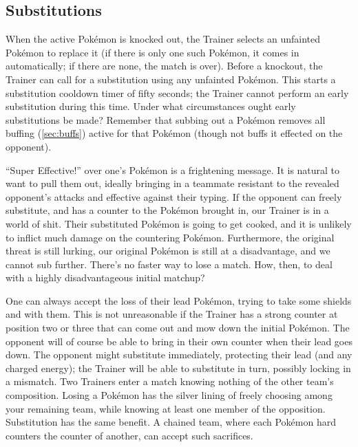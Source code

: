 \subsection{Substitutions\label{subsec:substitutions}}
When the active Pokémon is knocked out, the Trainer selects an unfainted
  Pokémon to replace it (if there is only one such Pokémon, it comes in
  automatically; if there are none, the match is over).
Before a knockout, the Trainer can call for a substitution using any
  unfainted Pokémon.
This starts a substitution cooldown timer of fifty seconds; the Trainer
  cannot perform an early substitution during this time.
Under what circumstances ought early substitutions be made?
Remember that subbing out a Pokémon removes all buffing (\autoref{sec:buffs})
  active for that Pokémon (though not buffs it effected on the opponent).

``Super Effective!'' over one's Pokémon is a frightening message.
It is natural to want to pull them out, ideally bringing in a teammate resistant
  to the revealed opponent's attacks and effective against their typing.
If the opponent can freely substitute, and has a counter to the Pokémon brought in,
  our Trainer is in a world of shit.
Their substituted Pokémon is going to get cooked, and it is unlikely to inflict much damage on the countering Pokémon.
Furthermore, the original threat is still lurking, our original Pokémon is still at a disadvantage,
 and we cannot sub further.
There's no faster way to lose a match.
How, then, to deal with a highly disadvantageous initial matchup?

One can always accept the loss of their lead Pokémon, trying to take some shields and \HP{} with them.
This is not unreasonable if the Trainer has a strong counter at position two or three
  that can come out and mow down the initial Pokémon.
The opponent will of course be able to bring in their own counter when their lead goes down.
The opponent might substitute immediately, protecting their lead (and any charged energy); the Trainer will be able to substitute in turn, possibly locking in a mismatch.
Two Trainers enter a match knowing nothing of the other team's composition.
Losing a Pokémon has the silver lining of freely choosing among your remaining team,
  while knowing at least one member of the opposition.
Substitution has the same benefit.
A chained team, where each Pokémon hard counters the counter of another, can accept such sacrifices.


